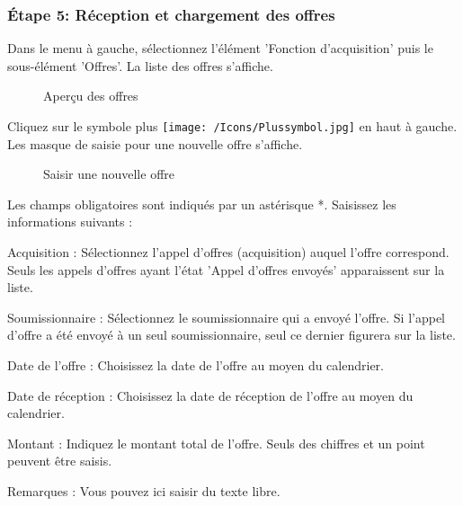 \subsubsection{Étape 5: Réception et chargement des offres}

Dans le menu à gauche, sélectionnez l'élément 'Fonction d'acquisition' puis le sous-élément 'Offres'. La liste des offres s'affiche.

\begin{figure}[H]
\caption{Aperçu des offres}
\end{figure}

Cliquez sur le symbole plus \texttt{[image: /Icons/Plussymbol.jpg]}  en haut à gauche. Les masque de saisie pour une nouvelle offre s'affiche.

\begin{figure}[H]
\caption{Saisir une nouvelle offre}
\end{figure}


Les champs obligatoires sont indiqués par un astérisque *. Saisissez les informations suivants :

\vspace{\baselineskip}

\begin{compactitem}
\item
Acquisition  : Sélectionnez l'appel d'offres (acquisition) auquel l'offre correspond. Seuls les appels d'offres ayant l'état 'Appel d'offres envoyés' apparaissent sur la liste.
\item
Soumissionnaire  : Sélectionnez le soumissionnaire qui a envoyé l'offre. Si l'appel d'offre a été envoyé à un seul soumissionnaire, seul ce dernier figurera sur la liste.
\item
Date de l'offre  : Choisissez la date de l'offre au moyen du calendrier.
\item
Date de réception  : Choisissez la date de réception de l'offre au moyen du calendrier.
\item
Montant  : Indiquez le montant total de l'offre. Seuls des chiffres et un point peuvent être saisis.
\item
Remarques  : Vous pouvez ici saisir du texte libre.
\end{compactitem}

\vspace{\baselineskip}

